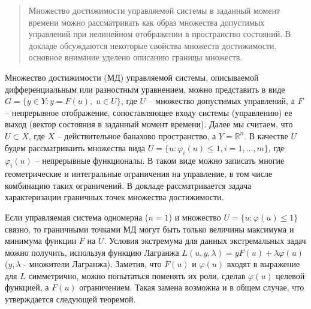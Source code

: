 \begin{abstract}
Множество достижимости управляемой системы  в заданный момент времени можно рассматривать как образ множества допустимых управлений при нелинейном отображении в пространство состояний.  В докладе обсуждаются некоторые свойства множеств достижимости, основное внимание уделено описанию границы множеств.

\end{abstract}





Множество достижимости (МД)  управляемой системы, описываемой дифференциальным  или  разностным уравнением,  можно  представить  в виде 
 $G=\big\{y \in Y: y=F(u),\; u \in U \big\}$, где $U$ -- множество допустимых управлений, а $F$ -- непрерывное отображение, сопоставляющее  входу системы (управлению)  ее выход (вектор состояния в заданный момент времени).  Далее мы считаем, что  $U\subset X$, где $X$ -- действительное банахово пространство, а $Y=\mathbb R^n$.  В качестве $U$ будем рассматриваить множества вида $U=\{u:\varphi_i(u)\leq 1, i=1,...,m\}$, где $\varphi_i(u)$ -- непрерывные функционалы.  В таком виде можно записать многие геометрические и интегральные ограничения на управление, в том числе комбинацию таких ограничений.  В докладе рассматривается  задача характеризации граничных точек множества достижимости. 
 
  Если управляемая система одномерна ($n=1$)  и множество $U= \{u:\varphi(u)\leq 1\}$  связно, то граничными точками МД могут быть  только величины максимума и минимума функции $F$ на $U$.  Условия экстремума для данных экстремальных задач  можно получить, используя функцию  Лагранжа $L(u, y, \lambda)=y F(u) +\lambda \varphi(u)$ ($y,\lambda$ - множители Лагранжа). Заметив, что $F(u)$ и $\varphi(u)$ входят в выражение для $L$ симметрично, можно попытаться поменять их роли, сделав $\varphi(u)$ целевой функцией, а $F(u)$ ограничением. Такая замена возможна и в общем случае, что утверждается следующей теоремой.
 
